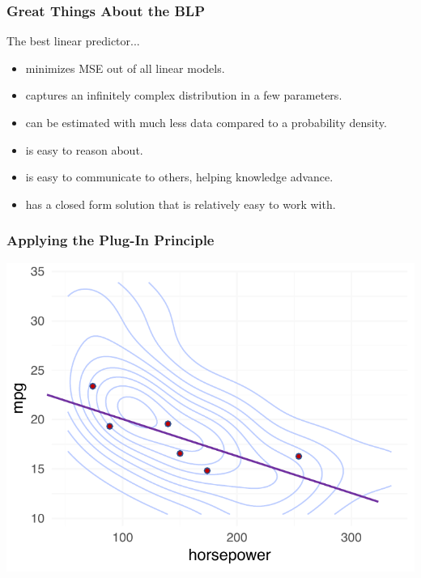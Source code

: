 \documentclass[12pt, block=fill]{beamer}
\begin{document}
\begin{frame}
  \frametitle{Great Things About the BLP}
  The best linear predictor...
  \begin{itemize}
\item minimizes MSE out of all linear models.
\item captures an infinitely complex distribution in a few parameters.
\item can be estimated with much less data compared to a probability density.
\item is easy to reason about.
\item is easy to communicate to others, helping knowledge advance.
\item has a closed form solution that is relatively easy to work with.

\end{itemize}

\end{frame}





  
  \begin{frame}
  \frametitle{Applying the Plug-In Principle}
    \includegraphics[width=\textwidth]{images/mpg_data}
\end{frame}
\end{document}

